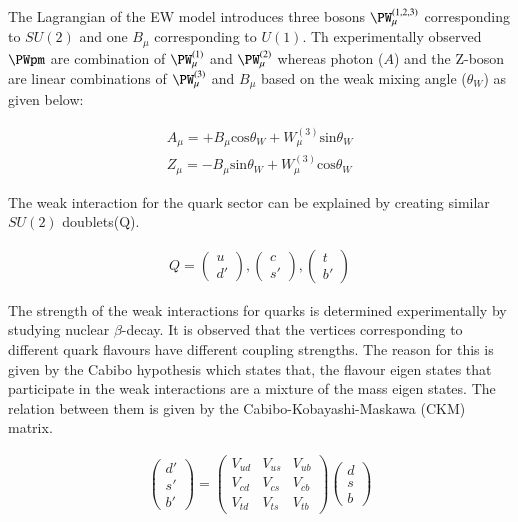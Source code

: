 The Lagrangian of the EW model introduces three bosons $\PW_\mu^{(1,2,3)}$ corresponding
to $SU(2)$ and one $B_\mu$ corresponding to $U(1)$. Th experimentally observed $\PWpm$
are combination of $\PW_\mu^{(1)}$ and $\PW_\mu^{(2)}$ whereas photon ($A$) and the Z-boson are linear
combinations of $\PW_\mu^{(3)}$ and $B_\mu$ based on the weak mixing angle ($\theta_W$)
as given below:

\begin{align}
A_\mu = +B_\mu \text{cos} \theta_W + W_\mu^{(3)}\text{sin} \theta_W \\
Z_\mu = -B_\mu \text{sin} \theta_W + W_\mu^{(3)}\text{cos} \theta_W 
\end{align}

The weak interaction for the quark sector can be explained by creating similar
$SU(2)$ doublets(Q).

\begin{align}
    Q = \begin{pmatrix} u \\ d' \end{pmatrix}, \begin{pmatrix} c \\ s' \end{pmatrix}, \begin{pmatrix} t \\ b' \end{pmatrix}
\end{align}

The strength of the weak interactions for quarks is determined experimentally by studying
nuclear $\beta$-decay. It is observed that the vertices corresponding to different quark
flavours have different coupling strengths. The reason for this is given by the Cabibo
hypothesis which states that, the flavour eigen states that participate in the weak interactions
are a mixture of the mass eigen states. The relation between them is given by the 
Cabibo-Kobayashi-Maskawa (CKM) matrix. 

\begin{align}
    \begin{pmatrix} d' \\ s' \\ b'\end{pmatrix}
     = \begin{pmatrix} V_{ud} & V_{us} & V_{ub} \\
                       V_{cd} & V_{cs} & V_{cb} \\
                       V_{td} & V_{ts} & V_{tb}
    \end{pmatrix} \begin{pmatrix} d \\ s \\ b\end{pmatrix}
\end{align}

